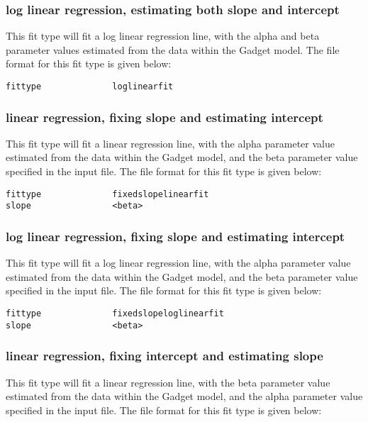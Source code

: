 \documentclass [a4paper, 10pt]{book}
\begin{document}
\subsubsection{log linear regression, estimating both slope and intercept}
This fit type will fit a log linear regression line, with the alpha and beta parameter values estimated from the data within the Gadget model.  The file format for this fit type is given below:

{\small\begin{verbatim}
fittype              loglinearfit
\end{verbatim}}

\subsubsection{linear regression, fixing slope and estimating intercept}
This fit type will fit a linear regression line, with the alpha parameter value estimated from the data within the Gadget model, and the beta parameter value specified in the input file.  The file format for this fit type is given below:

{\small\begin{verbatim}
fittype              fixedslopelinearfit
slope                <beta>
\end{verbatim}}

\subsubsection{log linear regression, fixing slope and estimating intercept}
This fit type will fit a log linear regression line, with the alpha parameter value estimated from the data within the Gadget model, and the beta parameter value specified in the input file.  The file format for this fit type is given below:

{\small\begin{verbatim}
fittype              fixedslopeloglinearfit
slope                <beta>
\end{verbatim}}

\subsubsection{linear regression, fixing intercept and estimating slope}
This fit type will fit a linear regression line, with the beta parameter value estimated from the data within the Gadget model, and the alpha parameter value specified in the input file.  The file format for this fit type is given below:
\end{document}
